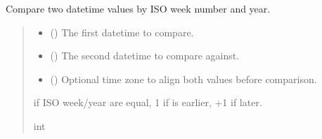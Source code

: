 \documentclass[letterpaper,10pt,english]{sphinxmanual}
\begin{document}
\begin{fulllineitems}
\begin{fulllineitems}
\label{\detokenize{apache_commons_validator_python.routines:apache_commons_validator_python.routines.date_validator.DateValidator.compare_weeks}}
\pysigstartsignatures
{}
\pysigstopsignatures
\sphinxAtStartPar
Compare two datetime values by ISO week number and year.
\begin{quote}\begin{description}
\begin{itemize}
\item {} 
\sphinxAtStartPar
{} () \textendash{} The first datetime to compare.

\item {} 
\sphinxAtStartPar
{} () \textendash{} The second datetime to compare against.

\item {} 
\sphinxAtStartPar
{} (\sphinxstyleliteralemphasis{\sphinxupquote{{[}}}\sphinxstyleliteralemphasis{\sphinxupquote{{]}}}) \textendash{} Optional time zone to align both values before comparison.

\end{itemize}

 if ISO week/year are equal, \sphinxhyphen{}1 if  is earlier, +1 if later.

\sphinxAtStartPar
int

\end{description}\end{quote}

\end{fulllineitems}


\end{fulllineitems}
\end{document}
